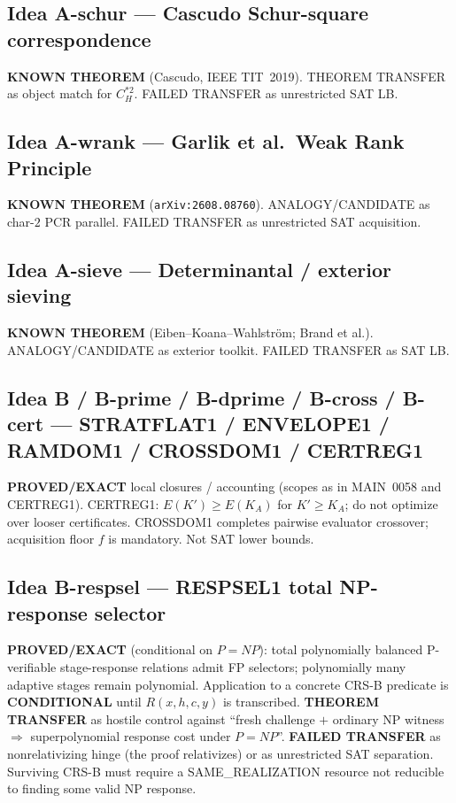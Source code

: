 \documentclass[11pt]{article}
\begin{document}
\subsection*{Idea A-schur --- Cascudo Schur-square correspondence}
\textbf{KNOWN THEOREM} (Cascudo, IEEE TIT~2019). THEOREM TRANSFER as object match
for $C_H^{*2}$. FAILED TRANSFER as unrestricted SAT LB.

\subsection*{Idea A-wrank --- Garlik et al.\ Weak Rank Principle}
\textbf{KNOWN THEOREM} (\texttt{arXiv:2608.08760}). ANALOGY/CANDIDATE as char-$2$
PCR parallel. FAILED TRANSFER as unrestricted SAT acquisition.

\subsection*{Idea A-sieve --- Determinantal / exterior sieving}
\textbf{KNOWN THEOREM} (Eiben--Koana--Wahlstr\"om; Brand et al.). ANALOGY/CANDIDATE
as exterior toolkit. FAILED TRANSFER as SAT LB.

\subsection*{Idea B / B-prime / B-dprime / B-cross / B-cert --- STRATFLAT1 / ENVELOPE1 / RAMDOM1 / CROSSDOM1 / CERTREG1}
\textbf{PROVED/EXACT} local closures / accounting (scopes as in MAIN~0058 and
CERTREG1). CERTREG1: $E(K')\ge E(K_A)$ for $K'\ge K_A$; do not optimize over
looser certificates. CROSSDOM1 completes pairwise evaluator crossover; acquisition
floor $f$ is mandatory. Not SAT lower bounds.

\subsection*{Idea B-respsel --- RESPSEL1 total NP-response selector}
\textbf{PROVED/EXACT} (conditional on $P=NP$): total polynomially balanced
P-verifiable stage-response relations admit FP selectors; polynomially many
adaptive stages remain polynomial. Application to a concrete CRS-B predicate is
\textbf{CONDITIONAL} until $R(x,h,c,y)$ is transcribed.
\textbf{THEOREM TRANSFER} as hostile control against ``fresh challenge $+$ ordinary
NP witness $\Rightarrow$ superpolynomial response cost under $P=NP$''.
\textbf{FAILED TRANSFER} as nonrelativizing hinge (the proof relativizes) or as
unrestricted SAT separation.
Surviving CRS-B must require a SAME\_REALIZATION resource not reducible to finding
some valid NP response.
\end{document}
